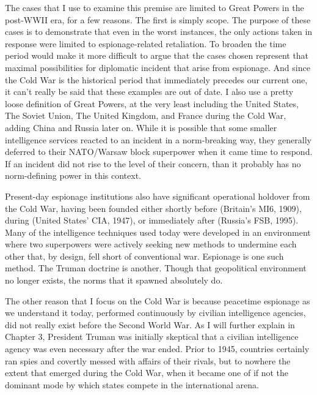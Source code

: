 \documentclass{report}
\begin{document}
\begin{refsegment}
The cases that I use to examine this premise are limited to Great Powers in the post-WWII era, for a few reasons. The first is simply scope. The purpose of these cases is to demonstrate that even in the worst instances, the only actions taken in response were limited to espionage-related retaliation. To broaden the time period would make it more difficult to argue that the cases chosen represent that maximal possibilities for diplomatic incident that arise from espionage. And since the Cold War is the historical period that immediately precedes our current one, it can't really be said that these examples are out of date. I also use a pretty loose definition of Great Powers, at the very least including the United States, The Soviet Union, The United Kingdom, and France during the Cold War, adding China and Russia later on. While it is possible that some smaller intelligence services reacted to an incident in a norm-breaking way, they generally deferred to their NATO/Warsaw block superpower when it came time to respond. If an incident did not rise to the level of their concern, than it probably has no norm-defining power in this context.

Present-day espionage institutions also have significant operational holdover from the Cold War, having been founded either shortly before (Britain's MI6, 1909), during (United States' CIA, 1947), or immediately after (Russia's FSB, 1995). Many of the intelligence techniques used today were developed in an environment where two superpowers were actively seeking new methods to undermine each other that, by design, fell short of conventional war. Espionage is one such method. The Truman doctrine is another. Though that geopolitical environment no longer exists, the norms that it spawned absolutely do.

The other reason that I focus on the Cold War is because peacetime espionage as we understand it today, performed continuously by civilian intelligence agencies, did not really exist before the Second World War. As I will further explain in Chapter 3, President Truman was initially skeptical that a civilian intelligence agency was even necessary after the war ended. Prior to 1945, countries certainly ran spies and covertly messed with affairs of their rivals, but to nowhere the extent that emerged during the Cold War, when it became one of if not the dominant mode by which states compete in the international arena.


\end{refsegment}
\end{document}
